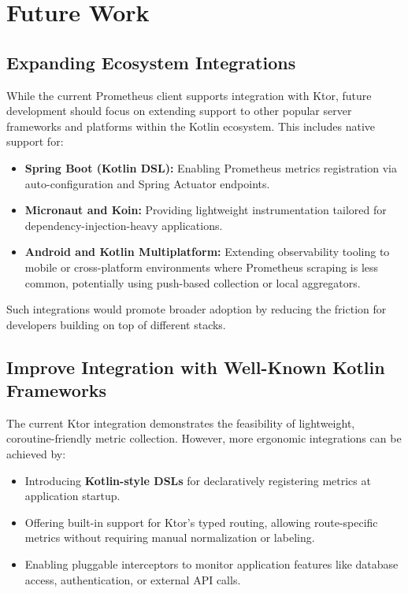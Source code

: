 \chapter{Future Work} \label{cap:future}

\section{Expanding Ecosystem Integrations}
While the current Prometheus client supports integration with Ktor, future development should focus on extending support to other popular server frameworks and platforms within the Kotlin ecosystem. This includes native support for:
\begin{itemize}
    \item \textbf{Spring Boot (Kotlin DSL):} Enabling Prometheus metrics registration via auto-configuration and Spring Actuator endpoints.
    \item \textbf{Micronaut and Koin:} Providing lightweight instrumentation tailored for dependency-injection-heavy applications.
    \item \textbf{Android and Kotlin Multiplatform:} Extending observability tooling to mobile or cross-platform environments where Prometheus scraping is less common, potentially using push-based collection or local aggregators.
\end{itemize}

Such integrations would promote broader adoption by reducing the friction for developers building on top of different stacks.

\section{Improve Integration with Well-Known Kotlin Frameworks}
The current Ktor integration demonstrates the feasibility of lightweight, coroutine-friendly metric collection. However, more ergonomic integrations can be achieved by:
\begin{itemize}
    \item Introducing \textbf{Kotlin-style DSLs} for declaratively registering metrics at application startup.
    \item Offering built-in support for Ktor’s typed routing, allowing route-specific metrics without requiring manual normalization or labeling.
    \item Enabling pluggable interceptors to monitor application features like database access, authentication, or external API calls.
\end{itemize}

